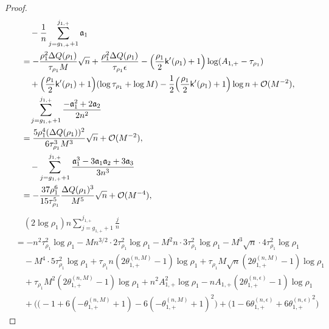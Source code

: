 \documentclass[a4paper]{article}
\numberwithin{equation}{section}
\begin{document}
\begin{proof}
\begin{align*}
&\quad -\frac{1}{n}\sum_{j=g_{1,+}+1}^{j_{1,+}}\mathfrak{a}_1
\\
&=
-\frac{\rho_1^2\Delta Q(\rho_1)}{\tau_{\rho_1}M}\sqrt{n}
+\frac{\rho_1^2\Delta Q(\rho_1)}{\tau_{\rho_1}\epsilon}
-\Bigl(\frac{\rho_1}{2}\mathsf{k}'(\rho_1)+1\Bigr)\log (A_{1,+}-\tau_{\rho_1})
\\
&\quad 
+\Bigl(\frac{\rho_1}{2}\mathsf{k}'(\rho_1)+1\Bigr)(\log \tau_{\rho_1}+\log M)
-\frac{1}{2}\Bigl(\frac{\rho_1}{2}\mathsf{k}'(\rho_1)+1\Bigr)\log n+\mathcal{O}(M^{-2}),
\\
&\quad \sum_{j=g_{1,+}+1}^{j_{1,+}}
\frac{-\mathfrak{a}_1^2+2\mathfrak{a}_2}{2n^2}
\\
&=
\frac{5\rho_1^4(\Delta Q(\rho_1))^2}{6\tau_{\rho_1}^3M^3}\sqrt{n}+\mathcal{O}(M^{-2}),
\\
&\quad -\sum_{j=g_{1,+}+1}^{j_{1,+}}\frac{\mathfrak{a}_1^3-3\mathfrak{a}_1\mathfrak{a}_2+3\mathfrak{a}_3}{3n^3}
\\
&=-\frac{37\rho_1^6}{15\tau_{\rho_1}^5}\frac{\Delta Q(\rho_1)^3}{M^5}\sqrt{n}+\mathcal{O}(M^{-4}), 
\end{align*}
\begin{align*}
&\quad(2\log \rho_1)n\sum_{j=g_{1,+}+1}^{j_{1,+}}\frac{j}{n}
\\
&=
-n^2\tau_{\rho_1}^2\log \rho_1
-Mn^{3/2}\cdot 2\tau_{\rho_1}^2\log \rho_1
-M^2n\cdot 3\tau_{\rho_1}^2\log \rho_1
-M^3\sqrt{n}\cdot 4\tau_{\rho_1}^2\log \rho_1
\\
&\quad
-M^4\cdot 5\tau_{\rho_1}^2\log \rho_1
+\tau_{\rho_1}n(2\theta_{1,+}^{(n,M)}-1)\log \rho_1
+\tau_{\rho_1}M\sqrt{n}(2\theta_{1,+}^{(n,M)}-1)\log \rho_1
\\
&\quad
+\tau_{\rho_1}M^2(2\theta_{1,+}^{(n,M)}-1)\log \rho_1
+n^2A_{1,+}^2\log \rho_1
-nA_{1,+}(2\theta_{1,+}^{(n,\epsilon)}-1)\log \rho_1
\\
&\quad
+\bigg( 
\bigl(-1+6(-\theta_{1,+}^{(n,M)}+1)-6(-\theta_{1,+}^{(n,M)}+1)^2\bigr)
+
\bigl(1-6\theta_{1,+}^{(n,\epsilon)}+6{\theta_{1,+}^{(n,\epsilon)}}^2\bigr)

\end{align*}
\end{proof}
\end{document}
